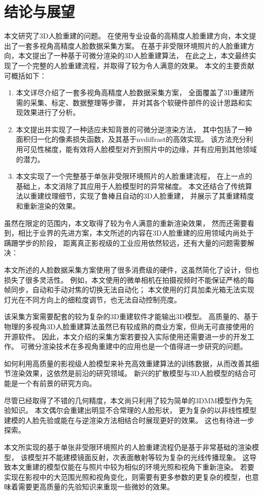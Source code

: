 \documentclass{scutmaster}
\newcommand{\changed}[1]{{\color{red}#1}}
\begin{document}
{
\backmatter
\chapter{结论与展望}
\label{chap:conclusion}

\changed{
本文研究了3D人脸重建的问题。
在使用专业设备的高精度人脸重建方向，本文提出了一套多视角高精度人脸数据采集方案。
在基于非受限环境照片的人脸重建方向，本文提出了一种基于可微分渲染的3D人脸重建算法，}
在此之上，本文最终实现了一个完整的人脸重建流程，并取得了较为令人满意的效果。
本文的主要贡献可概括如下：
\begin{enumerate}
\item \changed{本文详尽介绍了一套多视角高精度人脸数据采集方案，
全面覆盖了3D重建所需的采集、标定、数据整理等步骤，
并对其各个软硬件部件的设计思路和实现效果进行了分析。}
\item 本文提出并实现了一种适应未知背景的可微分逆渲染方法，
其中包括了一种面积归一化的像素损失函数，及其基于nvdiffrast的高效实现。
该方法充分利用可见性梯度，能有效将人脸模型对齐到照片中的边缘，并有应用到其他领域的潜力。
\item 本文实现了一个完整基于单张非受限环境照片的人脸重建流程，
在上一点的基础上，本文消除了其应用于人脸模型时的异常梯度。
本文还结合了传统算法以重建纹理细节，实现了鲁棒且自动的3D人脸重建，
并展示了其重建精度和重新渲染的效果。
\end{enumerate}

虽然在限定的范围内，本文取得了较为令人满意的重新渲染效果，
然而还需要看到，相比于业界的先进方案，本文所述的内容在3D人脸重建的应用领域内尚处于蹒跚学步的阶段，
距离真正影视级的工业应用依然较远，还有大量的问题需要解决：
\begin{enumerate}
\changed{
\item 本文所述的人脸数据采集方案使用了很多消费级的硬件，这虽然简化了设计，但也损失了很多灵活性。
例如，本文使用的微单相机在拍摄视频时不能保证严格的每帧同步，自动和手动对焦的切换无法自动化；
本文使用的灯具加柔光箱无法实现灯光在不同方向上的细粒度调节，也无法自动控制亮度。
\item 该采集方案需要配套的较为复杂的3D重建软件才能输出3D模型。
高质量的、基于物理的多视角3D人脸重建算法虽然已有较成熟的商业方案，但尚无可直接使用的开源软件。
因此，本文介绍的采集方案若要投入实际使用还需要进一步的开发工作。
可微分渲染技术在多视角重建中的应用也是一个值得进一步研究的问题。
}
\item 如何利用高质量的影视级人脸模型来补充高效重建算法的训练数据，从而改善其细节渲染效果，这依然是前沿的研究领域。
新兴的扩散模型与3D人脸模型的结合可能是一个有前景的研究方向。
\item 尽管已经取得了不错的几何精度，本文尚只利用了较为简单的3DMM模型作为先验知识。
本文偶尔会重建出明显不合常理的人脸形状，
更为复杂的以非线性模型建模的人脸先验或能在与逆渲染方法相结合时展现更好的效果。
这也有待进一步探索。
\item 本文所实现的基于单张非受限环境照片的人脸重建流程仍是基于非常基础的渲染模型，
该模型并不能建模镜面反射，次表面散射等较为复杂的光线传播现象。
这导致本文重建的模型仅能在与照片中较为相似的环境光照和视角下重新渲染。
若要实现在影视中的大范围光照和视角变化，则需要有更多参数的更复杂的模型，也意味着需要更高质量的先验知识来重现一些微妙的效果。
\end{enumerate}

}
\end{document}
